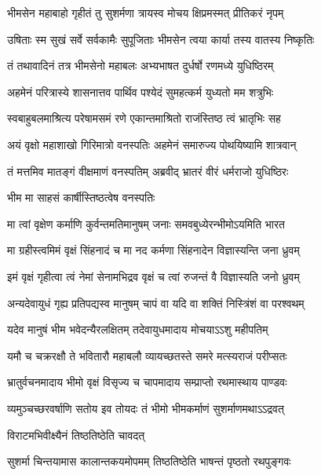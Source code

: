 \twolineshloka
{भीमसेन महाबाहो गृहीतं तु सुशर्मणा}
{त्रायस्व मोचय क्षिप्रमस्मत् प्रीतिकरं नृपम्}


\twolineshloka
{उषिताः स्म सुखं सर्वे सर्वकामैः सुपूजिताः}
{भीमसेन त्वया कार्या तस्य वातस्य निष्कृतिः}



\twolineshloka
{तं तथावादिनं तत्र भीमसेनो महाबलः}
{अभ्यभाषत दुर्धर्षो रणमध्ये युधिष्ठिरम्}


\twolineshloka
{अहमेनं परित्रास्ये शासनात्तव पार्थिव}
{पश्येदं सुमहत्कर्म युध्यतो मम शत्रुभिः}


\twolineshloka
{स्वबाहुबलमाश्रित्य परेषामसमं रणे}
{एकान्तमाश्रितो राजंस्तिष्ठ त्वं भ्रातृभिः सह}


\twolineshloka
{अयं वृक्षो महाशाखो गिरिमात्रो वनस्पतिः}
{अहमेनं समारुज्य पोथयिष्यामि शात्रवान्}



\twolineshloka
{तं मत्तमिव मातङ्गं वीक्षमाणं वनस्पतिम्}
{अब्रवीद् भ्रातरं वीरं धर्मराजो युधिष्ठिरः}



\onelineshloka
{भीम मा साहसं कार्षीस्तिष्ठत्वेष वनस्पतिः}

\twolineshloka
{मा त्वां वृक्षेण कर्माणि कुर्वन्तमतिमानुषम्}
{जनाः समवबुध्येरन्भीमोऽयमिति भारत}


\twolineshloka
{मा ग्रहीस्त्वमिमं वृक्षं सिंहनादं च मा नद}
{कर्मणा सिंहनादेन विज्ञास्यन्ति जना ध्रुवम्}


\twolineshloka
{इमं वृक्षं गृहीत्वा त्वं नेमां सेनामभिद्रव}
{वृक्षं च त्वां रुजन्तं वै विज्ञास्यति जनो ध्रुवम्}


\twolineshloka
{अन्यदेवायुधं गृह्य प्रतिपद्यस्व मानुषम्}
{चापं वा यदि वा शक्तिं निस्त्रिंशं वा परश्वथम्}


\twolineshloka
{यदेव मानुषं भीम भवेदन्यैरलक्षितम्}
{तदेवायुधमादाय मोचयाऽऽशु महीपतिम्}


\twolineshloka
{यमौ च चक्ररक्षौ ते भवितारौ महाबलौ}
{व्यायच्छतस्ते समरे मत्स्यराजं परीप्सतः}



\twolineshloka
{भ्रातुर्वचनमादाय भीमो वृक्षं विसृज्य च}
{चापमादाय सम्प्राप्तो रथमास्थाय पाण्डवः}


\twolineshloka
{व्यमुञ्चच्छरवर्षाणि सतोय इव तोयदः}
{तं भीमो भीमकर्माणं सुशर्माणमथाऽऽद्रवत्}


\onelineshloka
{विराटमभिवीक्ष्यैनं तिष्ठतिष्ठेति चावदत्}


\twolineshloka
{सुशर्मा चिन्तयामास कालान्तकयमोपमम्}
{तिष्ठतिष्ठेति भाषन्तं पृष्ठतो रथपुङ्गवः}


